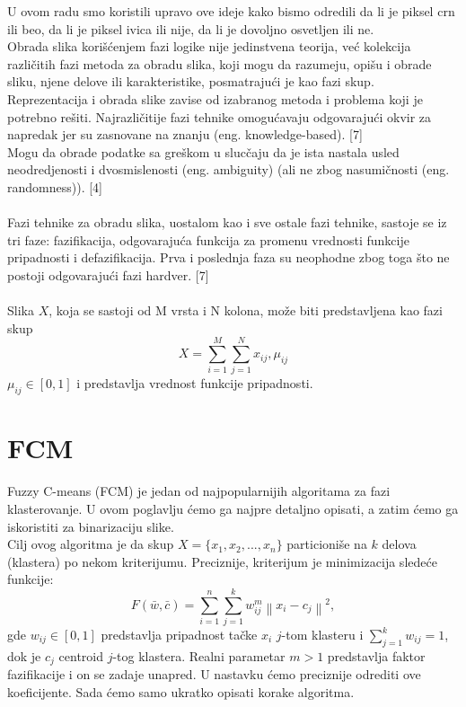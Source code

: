 \documentclass[12pt,a4paper]{article}
\theoremstyle{definition}
\theoremstyle{remark}
\theoremstyle{plain}
\begin{document}
U ovom radu smo koristili upravo ove ideje kako bismo odredili da li je piksel crn ili beo, da li je piksel ivica ili nije, da li je dovoljno osvetljen ili ne.\\

Obrada slika kori\v s\' cenjem fazi logike nije jedinstvena teorija, ve\' c kolekcija razli\v citih fazi metoda za obradu slika, koji mogu da razumeju, opi\v su i 
obrade sliku, njene delove ili karakteristike, posmatraju\' ci je kao fazi skup. \\
Reprezentacija i obrada slike zavise od izabranog metoda i problema koji je potrebno re\v siti.
Najrazli\v citije fazi tehnike omogu\' cavaju odgovaraju\' ci okvir za napredak jer su zasnovane na znanju (eng. knowledge-based). [7] \\ 
Mogu da obrade podatke sa gre\v skom u sluc\v caju da je ista nastala usled neodredjenosti i dvosmislenosti (eng. ambiguity) (ali ne zbog nasumi\v cnosti (eng. randomness)). [4]
\\ \\ 
Fazi tehnike za obradu slika, uostalom kao i sve ostale fazi tehnike, sastoje se iz tri faze: fazifikacija, odgovaraju\' ca funkcija za promenu vrednosti funkcije pripadnosti 
i defazifikacija. Prva i poslednja faza su neophodne zbog toga \v sto ne postoji odgovaraju\' ci fazi hardver. [7]
\\ \\ 
Slika $X$, koja se sastoji od M vrsta i N kolona, mo\v ze biti predstavljena kao fazi skup
\begin{equation}
  X = \sum_{i=1}^{M}\sum_{j=1}^{N} x_{ij}, \mu_{ij}
\end{equation}
$\mu_{ij} \in [0, 1]$ i predstavlja vrednost funkcije pripadnosti.


\section{FCM}
\label{sec:FCM}
Fuzzy C-means (FCM) je jedan od najpopularnijih algoritama za fazi klasterovanje. U ovom poglavlju \' cemo ga najpre detaljno opisati, a zatim \' cemo ga iskoristiti za binarizaciju slike.\\

Cilj ovog algoritma je da skup $X=\{x_{1}, x_{2}, ..., x_{n}\}$ particioni\v se na $k$ delova (klastera) po 
nekom kriterijumu. Preciznije, kriterijum je minimizacija slede\' ce funkcije:
\begin{equation*}
 F(\bar{w}, \bar{c}) = \sum_{i=1}^{n}\sum_{j=1}^{k}w_{ij}^{m}\left\|x_{i}-c_{j}\right\|^{2},
\end{equation*}
gde $w_{ij}\in [0, 1]$ predstavlja pripadnost ta\v cke $x_{i}$ $j$-tom klasteru i $\sum_{j=1}^{k}w_{ij}=1$, dok je $c_{j}$ centroid $j$-tog klastera. Realni parametar $m>1$ predstavlja faktor fazifikacije i on se zadaje unapred.
U nastavku \' cemo preciznije odrediti ove koeficijente. Sada \' cemo samo ukratko opisati korake algoritma.\\
\end{document}
